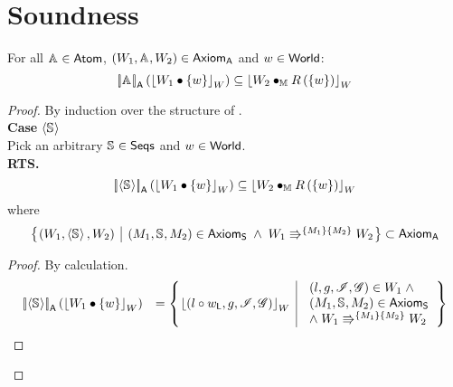 \newpage
\section*{Soundness}
\begin{lemma}
For all $\mathbb{A}_{} \in \textsf{Atom}$, $\left(W_1, \mathbb{A}_{}, W_2\right) \in \textsf{Axiom}_{\textsf{A}}$ and $w \in \textsf{World}$:
%
\[
	\left[\!\left| \mathbb{A}_{} \right |\! \right]_{\textsf{A}}\left( \left\lfloor W_1 \bullet \{w\} \right\rfloor_{W} \right) \subseteq \left\lfloor W_2 \bullet_{\mathbb{M}} R\left(\{w\}\right) \right\rfloor_{W}
\]
%
\begin{proof}
By induction over the structure of \atom{}.\\

\noindent\textbf{Case \hspace*{0.3cm}}$\left\langle \mathbb{S}_{} \right\rangle$\\
Pick an arbitrary $\mathbb{S}_{} \in \textsf{Seqs}$ and $w \in \textsf{World}$.\\
\textbf{RTS.}
%
\[
	\left[\!\left| \left\langle \mathbb{S}_{} \right\rangle \right |\! \right]_{\textsf{A}}\left( \left\lfloor W_1 \bullet \{w\} \right\rfloor_{W} \right) \subseteq \left\lfloor W_2 \bullet_{\mathbb{M}} R\left(\{w\}\right) \right\rfloor_{W}
\]
%
where
%
\begin{align}
	\left\{
	\hspace*{-0.15cm}
	\begin{array}{l | l}
		 \left(W_1, \atomic{\seq{}}, W_2 \right) &
		 (\Hp{1}, \seq{}, \Hp{2}) \in \AxiomsSeq \;\land\; \repartitions{W_1}{W_2}{\Hp{1}}{\Hp{2}}
	\end{array}
	\hspace*{-0.15cm}
	\right\}
	\subset \AxiomsA
	\nonumber
\end{align}
%
\begin{proof}
By calculation.\\
%
\[
\begin{array}{r l}
	\opSemA{\atomic{\seq{}}}{\reifyW{W_1 \composeW \{w\}}} &
	= 
	\left\{
	\hspace*{-0.15cm}
	\begin{array}{l | l}
		\reifyW{\left(l \composeL \localPart{w}, g, \lmod, \gmod \right)}
		&
		\begin{array}{l}
			(l, g, \lmod, \gmod) \in W_1 \;\land\\ 
			(\Hp{1}, \seq{}, \Hp{2}) \in \AxiomsSeq \\
			\land\;\repartitions{W_1}{W_2}{\Hp{1}}{\Hp{2}}
		\end{array}			
	\end{array}
	\hspace*{-0.15cm}
	\right\}\\
	


\end{array}\]
\end{proof}
\end{proof}
\end{lemma}
